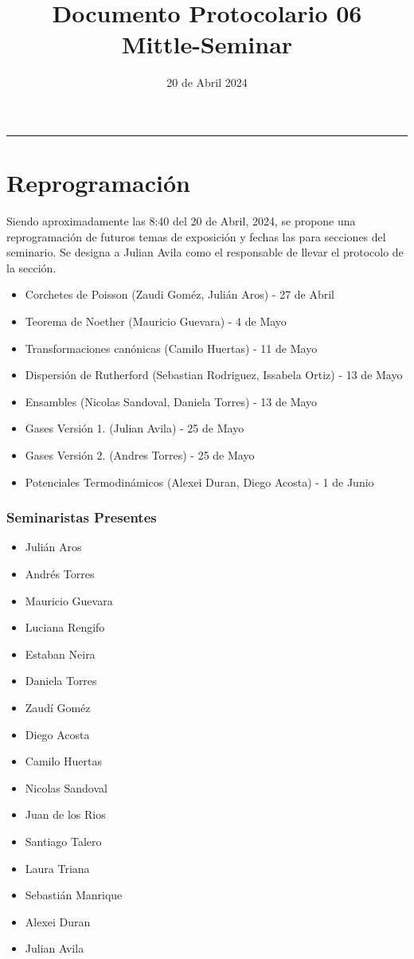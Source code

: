 \documentclass{article}
\title{\textbf{Documento Protocolario 06}\\ \small{Mittle-Seminar}}
\date{20 de Abril 2024}
\theoremstyle{definition}
\begin{document}
\maketitle
\thispagestyle{fancy}
\hrule

\section{Reprogramación}
Siendo aproximadamente las 8:40 del 20 de Abril, 2024, se propone una reprogramación de futuros temas de exposición y fechas las para secciones del seminario. Se designa a Julian Avila como el responsable de llevar el protocolo de la sección.

\begin{itemize}
	\item Corchetes de Poisson (Zaudi Goméz, Julián Aros) - 27 de Abril
	\item Teorema de Noether (Mauricio Guevara) - 4 de Mayo
	\item Transformaciones canónicas (Camilo Huertas) - 11 de Mayo
	\item Dispersión de Rutherford (Sebastian Rodriguez, Issabela Ortiz) - 13 de Mayo
	\item Ensambles (Nicolas Sandoval, Daniela Torres) - 13 de Mayo
	\item Gases Versión 1. (Julian Avila) - 25 de Mayo
	\item Gases Versión 2. (Andres Torres) - 25 de Mayo
	\item Potenciales Termodinámicos (Alexei Duran, Diego Acosta) - 1 de Junio
\end{itemize}

\subsubsection*{Seminaristas Presentes}
\begin{itemize}
	\item Julián Aros
	\item Andrés Torres
	\item Mauricio Guevara
	\item Luciana Rengifo
	\item Estaban Neira
	\item Daniela Torres
	\item Zaudí Goméz
	\item Diego Acosta
	\item Camilo Huertas
	\item Nicolas Sandoval
	\item Juan de los Rios
	\item Santiago Talero
	\item Laura Triana
	\item Sebastián Manrique
	\item Alexei Duran
	\item Julian Avila
\end{itemize}
\end{document}
